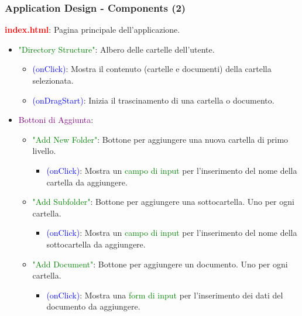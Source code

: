 \documentclass[aspectratio=169, dvipsnames]{beamer}
\begin{document}
\begin{frame}
    \frametitle{Application Design - Components (2)}
    \textbf{\textcolor{Red}{index.html}}: Pagina principale dell'applicazione.
    \begin{itemize}
        \item \textcolor{Green}{"Directory Structure"}: Albero delle cartelle dell'utente.
              \begin{itemize}
                  \item \textcolor{Blue}{(onClick)}: Mostra il contenuto (cartelle e documenti) della cartella
                        selezionata.
                  \item \textcolor{Blue}{(onDragStart)}: Inizia il trascinamento di una cartella o documento.
              \end{itemize}

        \item \textcolor{Purple}{Bottoni di Aggiunta}:
              \begin{itemize}
                  \item \textcolor{Green}{"Add New Folder"}: Bottone per aggiungere una nuova cartella di primo livello.
                        \begin{itemize}
                            \item \textcolor{Blue}{(onClick)}: Mostra un \textcolor{Green}{campo di input} per
                                  l'inserimento del nome della cartella da aggiungere.
                        \end{itemize}
                  \item \textcolor{Green}{"Add Subfolder"}: Bottone per aggiungere una sottocartella.
                        Uno per ogni cartella.
                        \begin{itemize}
                            \item \textcolor{Blue}{(onClick)}: Mostra un \textcolor{Green}{campo di input} per
                                  l'inserimento del nome della sottocartella da aggiungere.
                        \end{itemize}
                  \item \textcolor{Green}{"Add Document"}: Bottone per aggiungere un documento.
                        Uno per ogni cartella.
                        \begin{itemize}
                            \item \textcolor{Blue}{(onClick)}: Mostra una \textcolor{Green}{form di input} per
                                  l'inserimento dei dati del documento da aggiungere.
                        \end{itemize}
              \end{itemize}


\end{itemize}
\end{frame}
\end{document}
